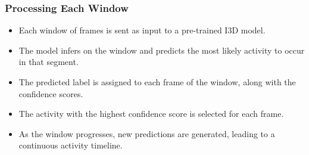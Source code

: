 \documentclass{article}
\begin{document}
\subsubsection{Processing Each Window}
\begin{itemize}
    \item Each window of frames is sent as input to a pre-trained I3D model.
    \item The model infers on the window and predicts the most likely activity to occur in that segment.
    \item The predicted label is assigned to each frame of the window, along with the confidence scores.
    \item The activity with the highest confidence score is selected for each frame.
    \item As the window progresses, new predictions are generated, leading to a continuous activity timeline.
\end{itemize}
\end{document}
